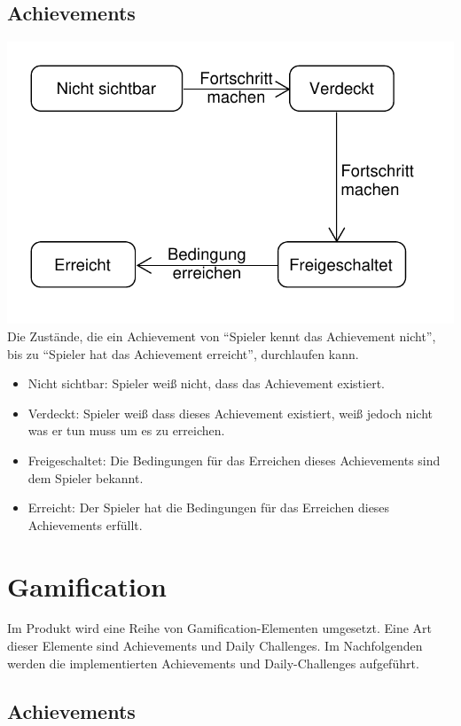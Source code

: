 \documentclass[a4paper]{scrreprt}
\begin{document}
    \section{Achievements}
    \label{fig:Achievement_State}
    \includegraphics[width=\textwidth]{img/Achievement_State.pdf}
    Die Zustände, die ein Achievement von \enquote{Spieler kennt das Achievement nicht}, bis zu \enquote{Spieler hat das Achievement erreicht}, durchlaufen kann.
    \begin{itemize}
        \item Nicht sichtbar: Spieler weiß nicht, dass das Achievement existiert.
        \item Verdeckt: Spieler weiß dass dieses Achievement existiert, weiß jedoch nicht was er tun muss um es zu erreichen.
        \item Freigeschaltet: Die Bedingungen für das Erreichen dieses Achievements sind dem Spieler bekannt.
        \item Erreicht: Der Spieler hat die Bedingungen für das Erreichen dieses Achievements erfüllt.
    \end{itemize}

    \chapter{Gamification}
    Im Produkt wird eine Reihe von Gamification-Elementen umgesetzt.
    Eine Art dieser Elemente sind Achievements und Daily Challenges.
    Im Nachfolgenden werden die implementierten Achievements und Daily-Challenges aufgeführt.

    \section{Achievements}
    \hypertarget{Ach}{}
\end{document}
